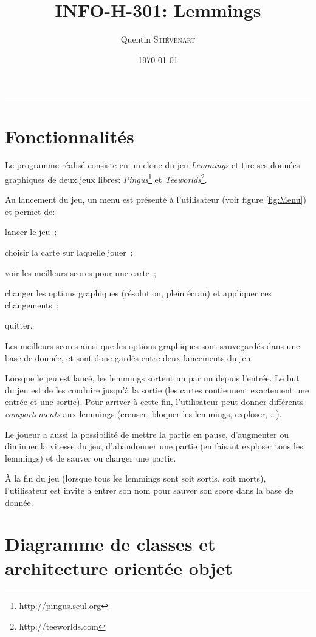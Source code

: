 \documentclass[a4paper,12pt]{article}
\title{INFO-H-301: Lemmings}
\author{Quentin \textsc{Stiévenart}}
\date{\today}
\newcommand{\HRule}{\rule{\linewidth}{0.5mm}}
\begin{document}
\maketitle

\HRule

\section{Fonctionnalités}

Le programme réalisé consiste en un clone du jeu
\emph{Lemmings} et tire ses données graphiques de deux jeux
libres: \emph{Pingus}\footnote{http://pingus.seul.org} et
\emph{Teeworlds}\footnote{http://teeworlds.com}.

Au lancement du jeu, un menu est présenté à l'utilisateur (voir figure
\ref{fig:Menu}) et permet de:
\begin{list}{-}{}
  \item lancer le jeu~;
  \item choisir la carte sur laquelle jouer~;
  \item voir les meilleurs scores pour une carte~;
  \item changer les options graphiques (résolution, plein
écran) et appliquer ces changements~;
  \item quitter.
\end{list}

Les meilleurs scores ainsi que les options graphiques sont
sauvegardés dans une base de donnée, et sont donc gardés
entre deux lancements du jeu.

Lorsque le jeu est lancé, les lemmings sortent un par un
depuis l'entrée. Le but du jeu est de les conduire jusqu'à
la sortie (les cartes contiennent exactement une entrée et
une sortie). Pour arriver à cette fin, l'utilisateur peut
donner différents \emph{comportements} aux lemmings
(creuser, bloquer les lemmings, exploser, \dots).

Le joueur a aussi la possibilité de mettre la partie en
pause, d'augmenter ou diminuer la vitesse du jeu,
d'abandonner une partie (en faisant exploser tous les
lemmings) et de sauver ou charger une partie.

À la fin du jeu (lorsque tous les lemmings sont soit sortis,
soit morts), l'utilisateur est invité à entrer son nom pour
sauver son score dans la base de donnée.

\section{Diagramme de classes et architecture orientée objet}
\end{document}
